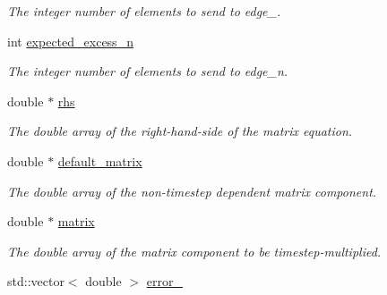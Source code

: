 \begin{DoxyCompactItemize}
\begin{DoxyCompactList}\small\item\em The integer number of elements to send to edge\-\_. \end{DoxyCompactList}\item 
\hypertarget{classone__d_1_1solver_a70da7ebd7e0c567586de45fbf28bfb8a}{int \hyperlink{classone__d_1_1solver_a70da7ebd7e0c567586de45fbf28bfb8a}{expected\-\_\-excess\-\_\-n}}\label{classone__d_1_1solver_a70da7ebd7e0c567586de45fbf28bfb8a}

\begin{DoxyCompactList}\small\item\em The integer number of elements to send to edge\-\_\-n. \end{DoxyCompactList}\item 
\hypertarget{classone__d_1_1solver_a9a37e318c74debf5210a52f781b1c1e7}{double $\ast$ \hyperlink{classone__d_1_1solver_a9a37e318c74debf5210a52f781b1c1e7}{rhs}}\label{classone__d_1_1solver_a9a37e318c74debf5210a52f781b1c1e7}

\begin{DoxyCompactList}\small\item\em The double array of the right-\/hand-\/side of the matrix equation. \end{DoxyCompactList}\item 
\hypertarget{classone__d_1_1solver_ac1002a2062ffc61df2ceddbd7d8d3f6e}{double $\ast$ \hyperlink{classone__d_1_1solver_ac1002a2062ffc61df2ceddbd7d8d3f6e}{default\-\_\-matrix}}\label{classone__d_1_1solver_ac1002a2062ffc61df2ceddbd7d8d3f6e}

\begin{DoxyCompactList}\small\item\em The double array of the non-\/timestep dependent matrix component. \end{DoxyCompactList}\item 
\hypertarget{classone__d_1_1solver_a7479d423e0d42293c9d953783f7715df}{double $\ast$ \hyperlink{classone__d_1_1solver_a7479d423e0d42293c9d953783f7715df}{matrix}}\label{classone__d_1_1solver_a7479d423e0d42293c9d953783f7715df}

\begin{DoxyCompactList}\small\item\em The double array of the matrix component to be timestep-\/multiplied. \end{DoxyCompactList}\item 
\hypertarget{classone__d_1_1solver_ab6cae4cf1e23a2e50b40d03ca146833b}{std\-::vector$<$ double $>$ \hyperlink{classone__d_1_1solver_ab6cae4cf1e23a2e50b40d03ca146833b}{error\-\_}}\label{classone__d_1_1solver_ab6cae4cf1e23a2e50b40d03ca146833b}


\end{DoxyCompactItemize}
